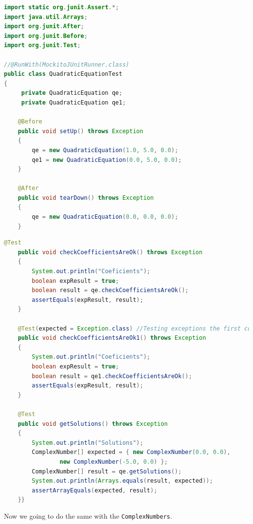 \documentclass[11pt, xcolor=svgnames]{beamer}
\begin{document}

\begin{frame}[fragile]
\begin{lstlisting}[language=JAVA,basicstyle=\tiny]
import static org.junit.Assert.*;
import java.util.Arrays;
import org.junit.After;
import org.junit.Before;
import org.junit.Test;

//@RunWith(MockitoJUnitRunner.class)
public class QuadraticEquationTest
{
	 private QuadraticEquation qe;
	 private QuadraticEquation qe1;
	
	@Before
	public void setUp() throws Exception
	{
		qe = new QuadraticEquation(1.0, 5.0, 0.0);
		qe1 = new QuadraticEquation(0.0, 5.0, 0.0);
	}

	@After
	public void tearDown() throws Exception
	{
		qe = new QuadraticEquation(0.0, 0.0, 0.0);
	}
\end{lstlisting}
\end{frame}


\begin{frame}[fragile]
\begin{lstlisting}[language=JAVA,basicstyle=\tiny]
	@Test
	public void checkCoefficientsAreOk() throws Exception
	{
		System.out.println("Coeficients");
		boolean expResult = true;
		boolean result = qe.checkCoefficientsAreOk();
		assertEquals(expResult, result);
	}

	@Test(expected = Exception.class) //Testing exceptions the first coeficient must not be 0
	public void checkCoefficientsAreOk1() throws Exception
	{
		System.out.println("Coeficients");
		boolean expResult = true;
		boolean result = qe1.checkCoefficientsAreOk();
		assertEquals(expResult, result);
	}
	
	@Test
	public void getSolutions() throws Exception
	{
		System.out.println("Solutions");
		ComplexNumber[] expected = { new ComplexNumber(0.0, 0.0),
				new ComplexNumber(-5.0, 0.0) };
		ComplexNumber[] result = qe.getSolutions();
		System.out.println(Arrays.equals(result, expected));
		assertArrayEquals(expected, result);
	}}
\end{lstlisting}
\end{frame}


\begin{frame}
Now we going to do the same with the \texttt{ComplexNumbers}.
\end{frame}
\end{document}
